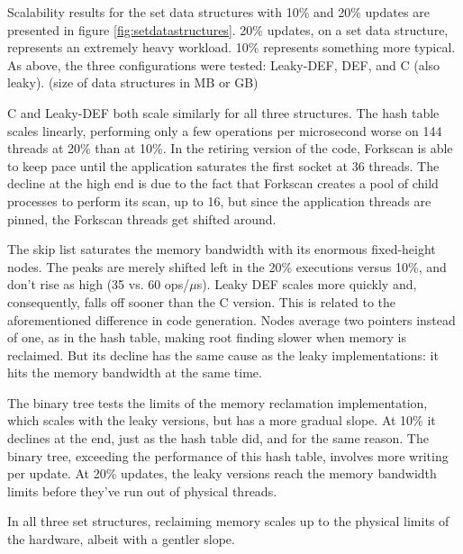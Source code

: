 Scalability results for the set data structures with 10\% and 20\% updates are presented in figure \ref{fig:setdatastructures}.  20\% updates, on a set data structure, represents an extremely heavy workload.  10\% represents something more typical.  As above, the three configurations were tested: Leaky-DEF, DEF, and C (also leaky).  (size of data structures in MB or GB)


C and Leaky-DEF both scale similarly for all three structures.  The hash table scales linearly, performing only a few operations per microsecond worse on 144 threads at 20\% than at 10\%.  In the retiring version of the code, Forkscan is able to keep pace until the application saturates the first socket at 36 threads.  The decline at the high end is due to the fact that Forkscan creates a pool of child processes to perform its scan, up to 16, but since the application threads are pinned, the Forkscan threads get shifted around.

The skip list saturates the memory bandwidth with its enormous fixed-height nodes.  The peaks are merely shifted left in the 20\% executions versus 10\%, and don't rise as high (35 vs. 60 ops/$\mu$s).  Leaky DEF scales more quickly and, consequently, falls off sooner than the C version.  This is related to the aforementioned difference in code generation.  Nodes average two pointers instead of one, as in the hash table, making root finding slower when memory is reclaimed.  But its decline has the same cause as the leaky implementations: it hits the memory bandwidth at the same time.

The binary tree tests the limits of the memory reclamation implementation, which scales with the leaky versions, but has a more gradual slope.  At 10\% it declines at the end, just as the hash table did, and for the same reason.  The binary tree, exceeding the performance of this hash table, involves more writing per update.  At 20\% updates, the leaky versions reach the memory bandwidth limits before they've run out of physical threads.

In all three set structures, reclaiming memory scales up to the physical limits of the hardware, albeit with a gentler slope.

